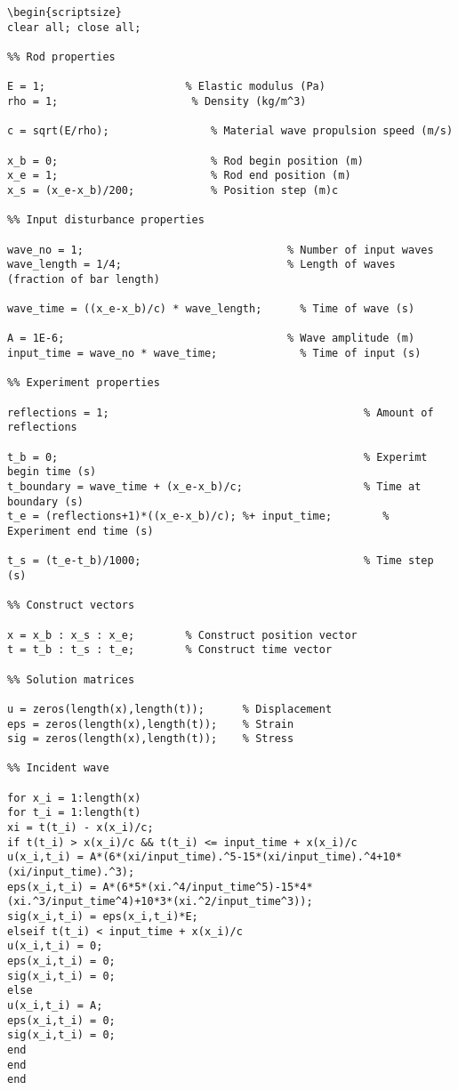 \begin{lstlisting}[breaklines=true,frame=none]
 \begin{scriptsize}
clear all; close all;
 
%% Rod properties
 
E = 1;                      % Elastic modulus (Pa)
rho = 1;                     % Density (kg/m^3)
 
c = sqrt(E/rho);                % Material wave propulsion speed (m/s)
 
x_b = 0;                        % Rod begin position (m)
x_e = 1;                        % Rod end position (m)
x_s = (x_e-x_b)/200;            % Position step (m)c
 
%% Input disturbance properties
 
wave_no = 1;                                % Number of input waves
wave_length = 1/4;                          % Length of waves (fraction of bar length)
 
wave_time = ((x_e-x_b)/c) * wave_length;      % Time of wave (s)

A = 1E-6;                                   % Wave amplitude (m)
input_time = wave_no * wave_time;             % Time of input (s)
 
%% Experiment properties
 
reflections = 1;                                        % Amount of reflections
 
t_b = 0;                                                % Experimt begin time (s)
t_boundary = wave_time + (x_e-x_b)/c;                   % Time at boundary (s)
t_e = (reflections+1)*((x_e-x_b)/c); %+ input_time;        % Experiment end time (s)
 
t_s = (t_e-t_b)/1000;                                   % Time step (s)
 
%% Construct vectors
 
x = x_b : x_s : x_e;        % Construct position vector
t = t_b : t_s : t_e;        % Construct time vector
 
%% Solution matrices
 
u = zeros(length(x),length(t));      % Displacement
eps = zeros(length(x),length(t));    % Strain
sig = zeros(length(x),length(t));    % Stress
 
%% Incident wave
 
for x_i = 1:length(x)
for t_i = 1:length(t)
xi = t(t_i) - x(x_i)/c;
if t(t_i) > x(x_i)/c && t(t_i) <= input_time + x(x_i)/c
u(x_i,t_i) = A*(6*(xi/input_time).^5-15*(xi/input_time).^4+10*(xi/input_time).^3);
eps(x_i,t_i) = A*(6*5*(xi.^4/input_time^5)-15*4*(xi.^3/input_time^4)+10*3*(xi.^2/input_time^3));
sig(x_i,t_i) = eps(x_i,t_i)*E;
elseif t(t_i) < input_time + x(x_i)/c
u(x_i,t_i) = 0;
eps(x_i,t_i) = 0;
sig(x_i,t_i) = 0;
else
u(x_i,t_i) = A;
eps(x_i,t_i) = 0;
sig(x_i,t_i) = 0;
end
end
end
 

\end{lstlisting}
